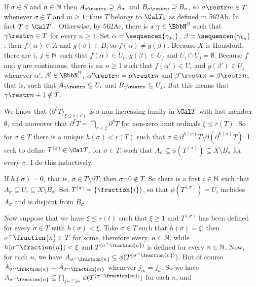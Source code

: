 {\noindent If $\sigma\in S$ and $n\in\Bbb N$ then
$A_{\sigma\restr n}\supseteq A_{\sigma}$ and
$B_{\sigma\restr n}\supseteq B_{\sigma}$, so $\sigma\restr m\in T$ whenever
$\sigma\in T$ and $m\ge 1$;
thus $T$ belongs to $\Cal T_0$ as defined in 562Ab.   In fact
$T\in\Cal T$.   \Prf\Quer\ Otherwise, by 562Ac, there is a $\gamma\in\NN$
such that $\gamma\restr n\in T$ for every $n\ge 1$.   Set
$\alpha=\sequencen{\gamma_{j_n}}$, $\beta=\sequencen{\gamma_{k_n}}$;
then $f(\alpha)\in A$ and $g(\beta)\in B$, so $f(\alpha)\ne g(\beta)$.
Because $X$ is Hausdorff, there are $i$, $j\in\Bbb N$ such that
$f(\alpha)\in U_i$, $g(\beta)\in U_j$ and $U_i\cap U_j=\emptyset$.
Because $f$ and $g$ are continuous, there is an $n\ge 1$ such that
$f(\alpha')\in U_i$ and $g(\beta')\in U_j$ whenever
$\alpha'$, $\beta'\in\NN$, $\alpha'\restr n=\alpha\restr n$ and
$\beta'\restr n=\beta\restr n$;  that is, such that
$A_{\gamma\restr n}\subseteq U_i$
and $B_{\gamma\restr n}\subseteq U_j$.   But this means that
$\gamma\restr n+1\notin T$.\ \Bang\Qed

\medskip

 We know that $\langle\partial^{\xi}T\rangle_{\xi\le r(T)}$
is a non-increasing family in $\Cal T$ with last member $\emptyset$, and
moreover that $\partial^{\xi}T=\bigcap_{\eta<\xi}\partial^{\eta}T$ for
non-zero limit ordinals $\xi\le r(T)$.   So for $\sigma\in T$ there is
a unique $h(\sigma)<r(T)$ such that
$\sigma\in\partial^{h(\sigma)}T\setminus\partial(\partial^{h(\sigma)}T)$.
I seek to define $T^{(\sigma)}\in\Cal T$, for $\sigma\in T$, such that
$A_{\sigma}\subseteq\phi(T^{(\sigma)})\subseteq X\setminus B_{\sigma}$
for every $\sigma$.   I do this inductively.

\medskip

 If $h(\sigma)=0$, that is, $\sigma\in T\setminus\partial T$,
then $\sigma^{\smallfrown}0\notin T$.
So there is a first $i\in\Bbb N$ such that
$A_{\sigma}\subseteq U_i\subseteq X\setminus B_{\sigma}$.
Set $T^{(\sigma)}=\{\fraction{i}\}$,
so that $\phi(T^{(\sigma)})=U_i$ includes $A_{\sigma}$ and is
disjoint from $B_{\sigma}$.

\medskip

 Now suppose that we have $\xi\le r(t)$ such that
$\xi\ge 1$ and
$T^{(\sigma)}$ has been defined for every $\sigma\in T$ with
$h(\sigma)<\xi$.
Take $\sigma\in T$ such that $h(\sigma)=\xi$;   then
$\sigma^{\smallfrown}\fraction{n}\in T$ for some, therefore every,
$n\in\Bbb N$, while
$h(\sigma^{\smallfrown}\fraction{n})<\xi$ and $T^{(\sigma^{\smallfrown}\fraction{n})}$ is defined
for every $n\in\Bbb N$.   Now, for each $n$, we have
$A_{\sigma^{\smallfrown}\fraction{n}}
\subseteq\phi(T^{(\sigma^{\smallfrown}\fraction{n})})$.   But of course
$A_{\sigma^{\smallfrown}\fraction{n}}=A_{\sigma^{\smallfrown}\fraction{m}}$
whenever $j_m=j_n$.   So we have
$A_{\sigma^{\smallfrown}\fraction{n}}
\subseteq\bigcap_{j_m=j_n}\phi(T^{(\sigma^{\smallfrown}\fraction{m})})$
for each $n$, and

}
